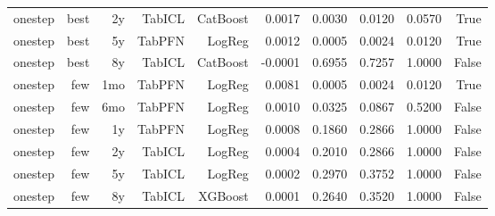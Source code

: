 \begin{table}[t]
\begin{tabular}{lrrrrrrrrr}
  onestep & best & 2y & TabICL & CatBoost & 0.0017 & 0.0030 & 0.0120 & 0.0570 & True \\
  onestep & best & 5y & TabPFN & LogReg & 0.0012 & 0.0005 & 0.0024 & 0.0120 & True \\
  onestep & best & 8y & TabICL & CatBoost & -0.0001 & 0.6955 & 0.7257 & 1.0000 & False \\
  onestep & few & 1mo & TabPFN & LogReg & 0.0081 & 0.0005 & 0.0024 & 0.0120 & True \\
  onestep & few & 6mo & TabPFN & LogReg & 0.0010 & 0.0325 & 0.0867 & 0.5200 & False \\
  onestep & few & 1y & TabPFN & LogReg & 0.0008 & 0.1860 & 0.2866 & 1.0000 & False \\
  onestep & few & 2y & TabICL & LogReg & 0.0004 & 0.2010 & 0.2866 & 1.0000 & False \\
  onestep & few & 5y & TabICL & LogReg & 0.0002 & 0.2970 & 0.3752 & 1.0000 & False \\
  onestep & few & 8y & TabICL & XGBoost & 0.0001 & 0.2640 & 0.3520 & 1.0000 & False \\
  \bottomrule
  \end{tabular}
\end{table}
